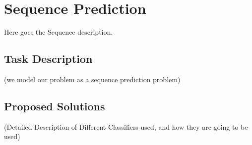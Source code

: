 \section{Sequence Prediction}

Here goes the Sequence description.

\subsection{Task Description}

(we model our problem as a sequence prediction problem)


\subsection{Proposed Solutions}
(Detailed Description of Different Classifiers used, and how they are going to be used)